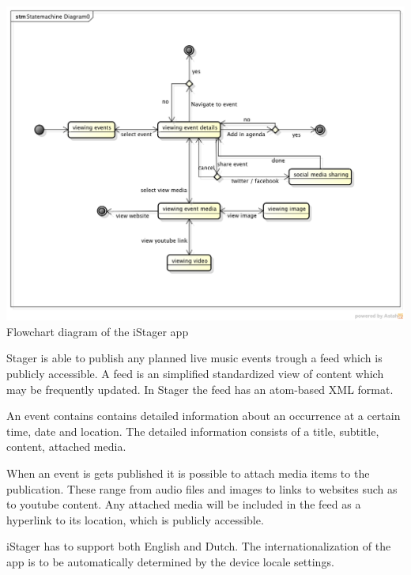 \begin{centering}
	\includegraphics[scale=0.4]{images/stagerapp_statediagram.png}\\{Flowchart diagram of the iStager app}\\
\end{centering}


Stager is able to publish any planned live music events trough a feed which is publicly accessible. A feed is an simplified standardized view of content which may be frequently updated. In Stager the feed has an atom-based XML format.

An event contains contains detailed information about an occurrence at a certain time, date and location. The detailed information consists of a title, subtitle, content, attached media. 

When an event is gets published it is possible to attach media items to the publication. These range from audio files and images to  links to websites such as to youtube content. Any attached media will be included in the feed as a hyperlink to its location, which is publicly accessible.

iStager has to support both English and Dutch. The internationalization of the app is to be automatically determined by the device locale settings. 



